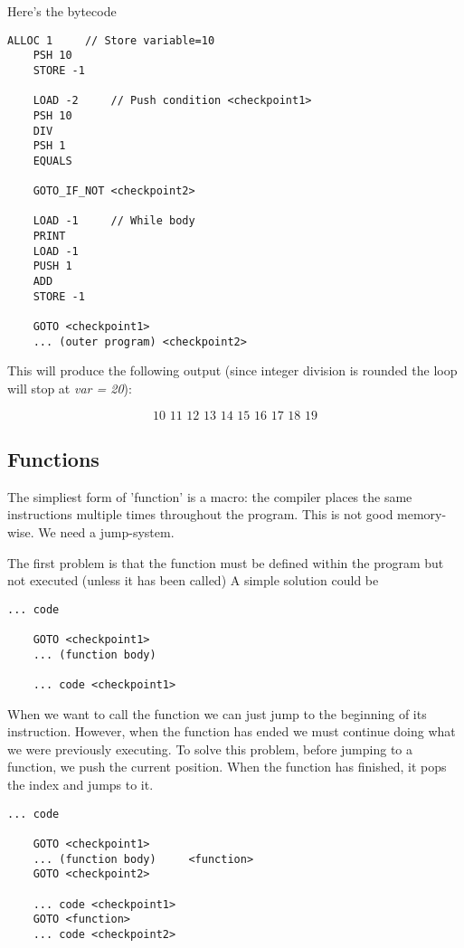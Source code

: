 \documentclass[../documentation.tex]{subfiles}
\begin{document}
\pagebreak

Here's the bytecode

\begin{lstlisting}[style=generic]
    ALLOC 1     // Store variable=10
    PSH 10
    STORE -1
    
    LOAD -2     // Push condition <checkpoint1>
    PSH 10
    DIV
    PSH 1
    EQUALS
    
    GOTO_IF_NOT <checkpoint2>
    
    LOAD -1     // While body
    PRINT
    LOAD -1
    PUSH 1
    ADD
    STORE -1

    GOTO <checkpoint1>
    ... (outer program) <checkpoint2>
\end{lstlisting}

This will produce the following output (since integer division is rounded the loop will stop at \textit{var = 20}):

\[
    10\,\,11\,\,12\,\,13\,\,14\,\,15\,\,16\,\,17\,\,18\,\,19
\]

\subsection{Functions}

The simpliest form of 'function' is a macro: the compiler places the same instructions multiple times throughout the program.
This is not good memory-wise. We need a jump-system.

The first problem is that the function must be defined within the program but not executed (unless it has been called)
A simple solution could be

\begin{lstlisting}[style=generic]
    ... code

    GOTO <checkpoint1>
    ... (function body)

    ... code <checkpoint1>
\end{lstlisting}

When we want to call the function we can just jump to the beginning of its instruction.
However, when the function has ended we must continue doing what we were previously executing.
To solve this problem, before jumping to a function, we push the current position.
When the function has finished, it pops the index and jumps to it.

\begin{lstlisting}[style=generic]
    ... code

    GOTO <checkpoint1>
    ... (function body)     <function>
    GOTO <checkpoint2>
    
    ... code <checkpoint1>
    GOTO <function>
    ... code <checkpoint2>
\end{lstlisting}
\end{document}
